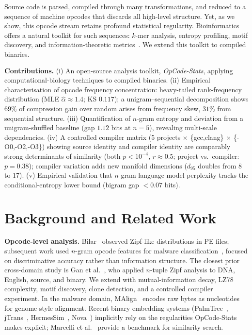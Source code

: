 \documentclass[conference]{IEEEtran}
\begin{document}
Source code is parsed, compiled through many transformations, and reduced to
a sequence of machine opcodes that discards all high-level structure.  Yet,
as we show, this opcode stream retains profound statistical regularity.
Bioinformatics offers a natural toolkit for such sequences: $k$-mer analysis,
entropy profiling, motif discovery, and information-theoretic
metrics~\cite{vinga2003alignment}.  We extend this toolkit to compiled
binaries.

\textbf{Contributions.}
(i) An open-source analysis toolkit, \emph{OpCode-Stats}, applying
computational-biology techniques to compiled binaries.
(ii) Empirical characterisation of opcode frequency concentration:
heavy-tailed rank-frequency distribution
(MLE $\hat{\alpha}{\approx}1.4$; KS $0.117$); a unigram--sequential
decomposition shows $69\%$ of compression gain over random arises from
frequency skew, $31\%$ from sequential structure.
(iii) Quantification of $n$-gram entropy and deviation from a
unigram-shuffled baseline (gap $1.12$ bits at $n{=}5$), revealing
multi-scale dependencies.
(iv) A controlled compiler matrix
(5 projects $\times$ \{gcc,clang\} $\times$ \{-O0,-O2,-O3\}) showing
source identity and compiler identity are comparably strong determinants
of similarity (both $p{<}10^{-4}$, $r{\approx}0.5$;
project vs.\ compiler: $p{=}0.38$); compiler variation adds new manifold
dimensions ($d_{95}$ doubles from 8 to 17).
(v) Empirical validation that $n$-gram language model perplexity tracks
the conditional-entropy lower bound (bigram gap ${<}0.07$ bits).

\section{Background and Related Work}
\label{sec:background}

\textbf{Opcode-level analysis.}
Bilar~\cite{bilar2007opcodes} observed Zipf-like distributions in PE files;
subsequent work used $n$-gram opcode features for malware
classification~\cite{masud2008machine,santos2013opcode}, focused on
discriminative accuracy rather than information structure.  The closest
prior cross-domain study is Gan et al.~\cite{gan2009statistical},
who applied $n$-tuple Zipf analysis to DNA, English, source, and binary.
We extend with mutual-information decay, LZ78 complexity, motif discovery,
clone detection, and a controlled compiler experiment.  In the malware
domain, MAlign~\cite{saha2024malign} encodes raw bytes as nucleotides for
genome-style alignment.  Recent binary embedding systems
(PalmTree~\cite{li2021palmtree}, jTrans~\cite{wang2022jtrans},
HermesSim~\cite{hermessim2024}, Nova~\cite{nova2025}) implicitly rely on
the regularities OpCode-Stats makes explicit; Marcelli et
al.~\cite{marcelli2022machine} provide a benchmark for similarity search.
\end{document}
